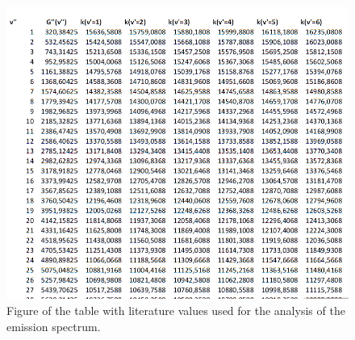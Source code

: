 \begin{figure}[ht]
	\includegraphics[scale=0.8]{Bild/DATA.png}
	\centering
	\caption[Table with Literature Values]{Figure of the table with literature values used for the analysis of the emission spectrum.\cite{Anleitung}}
\end{figure}